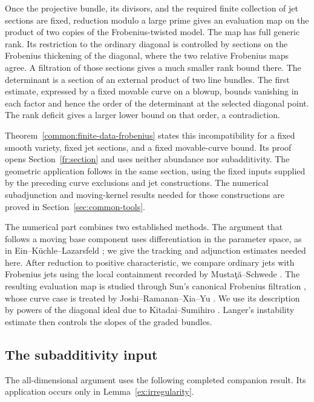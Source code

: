 Once the projective bundle, its divisors, and the
required finite collection of jet sections are fixed, reduction modulo a
large prime gives an evaluation map on the product of two copies of the
Frobenius-twisted model. The map has full generic rank. Its restriction
to the ordinary diagonal is controlled by sections on the Frobenius
thickening of the diagonal, where the two relative Frobenius maps agree.
A filtration of those sections gives a much smaller rank bound there.
The determinant is a section of an external product of two line bundles.
The first estimate, expressed by a fixed movable curve on a blowup,
bounds vanishing in each factor and hence the order of the determinant
at the selected diagonal point. The rank deficit gives a larger lower
bound on that order, a contradiction.

Theorem~\ref{common:finite-data-frobenius} states this incompatibility for
a fixed smooth variety, fixed jet sections, and a fixed movable-curve bound.
Its proof opens Section~\ref{fr:section} and uses neither abundance nor
subadditivity. The geometric application follows in the same section,
using the fixed inputs supplied by the preceding curve exclusions and
jet constructions. The numerical subadjunction and moving-kernel results
needed for those constructions are proved in Section~\ref{sec:common-tools}.

The numerical part combines two established methods.  The argument that
follows a moving base component uses differentiation in the parameter
space, as in Ein--K\"uchle--Lazarsfeld
\cite[Proposition~2.3]{EinKuchleLazarsfeld1995}; we give the tracking and
adjunction estimates needed here.  After reduction to positive
characteristic, we compare ordinary jets with Frobenius jets using the
local containment recorded by Musta\c{t}\u{a}--Schwede
\cite[Equation~(2.8)]{MustataSchwede2014}.  The resulting evaluation map
is studied through Sun's canonical Frobenius filtration
\cite[Theorem~3.7]{Sun2008}, whose curve case is treated by
Joshi--Ramanan--Xia--Yu \cite[Section~5.3]{JoshiRamananXiaYu2006}.
We use its description by powers of the diagonal ideal due to
Kitadai--Sumihiro \cite[Definition~3.1 and Remark~3.2]{KitadaiSumihiro2008}.
Langer's instability estimate \cite[Corollary~2.5]{Langer2004} then
controls the slopes of the graded bundles.

\subsection*{The subadditivity input}
The all-dimensional argument uses the following completed companion result.
Its application occurs only in Lemma~\ref{ex:irregularity}.

